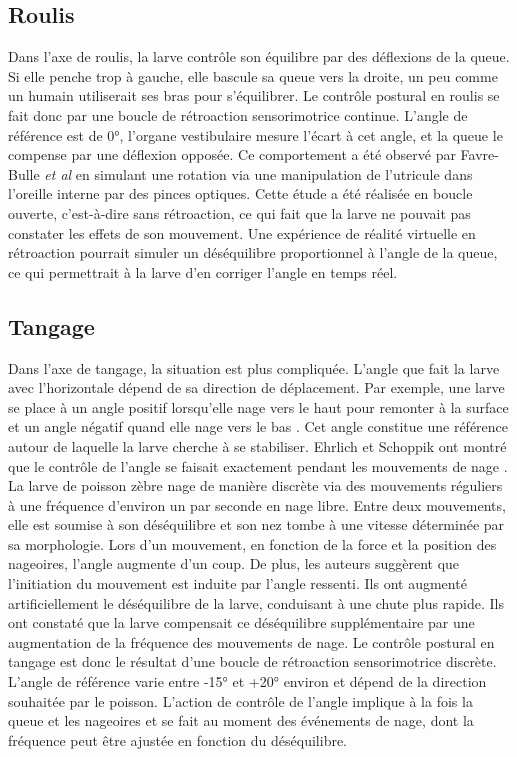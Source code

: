 \subsection{Roulis}
Dans l'axe de roulis, la larve contrôle son équilibre par des déflexions de la queue. Si elle penche trop à gauche, elle bascule sa queue vers la droite, un peu comme un humain utiliserait ses bras pour s'équilibrer. Le contrôle postural en roulis se fait donc par une boucle de rétroaction sensorimotrice continue. L'angle de référence est de 0°, l'organe vestibulaire mesure l'écart à cet angle, et la queue le compense par une déflexion opposée. Ce comportement a été observé par Favre-Bulle \emph{et al} en simulant une rotation via une manipulation de l'utricule dans l'oreille interne par des pinces optiques. Cette étude a été réalisée en boucle ouverte, c'est-à-dire sans rétroaction, ce qui fait que la larve ne pouvait pas constater les effets de son mouvement. Une expérience de réalité virtuelle en rétroaction pourrait simuler un déséquilibre proportionnel à l'angle de la queue, ce qui permettrait à la larve d'en corriger l'angle en temps réel.

\subsection{Tangage}
Dans l'axe de tangage, la situation est plus compliquée. L'angle que fait la larve avec l'horizontale dépend de sa direction de déplacement. Par exemple, une larve se place à un angle positif lorsqu'elle nage vers le haut pour remonter à la surface et un angle négatif quand elle nage vers le bas \cite{ehrlich_primal_2019}. Cet angle constitue une référence autour de laquelle la larve cherche à se stabiliser. Ehrlich et Schoppik ont montré que le contrôle de l'angle se faisait exactement pendant les mouvements de nage \cite{ehrlich_control_2017}. La larve de poisson zèbre nage de manière discrète via des mouvements réguliers à une fréquence d'environ un par seconde en nage libre. Entre deux mouvements, elle est soumise à son déséquilibre et son nez tombe à une vitesse déterminée par sa morphologie. Lors d'un mouvement, en fonction de la force et la position des nageoires, l'angle augmente d'un coup. De plus, les auteurs suggèrent que l'initiation du mouvement est induite par l'angle ressenti. Ils ont augmenté artificiellement le déséquilibre de la larve, conduisant à une chute plus rapide. Ils ont constaté que la larve compensait ce déséquilibre supplémentaire par une augmentation de la fréquence des mouvements de nage.
Le contrôle postural en tangage est donc le résultat d'une boucle de rétroaction sensorimotrice discrète. L'angle de référence varie entre -15° et +20° environ et dépend de la direction souhaitée par le poisson. L'action de contrôle de l'angle implique à la fois la queue et les nageoires et se fait au moment des événements de nage, dont la fréquence peut être ajustée en fonction du déséquilibre.

